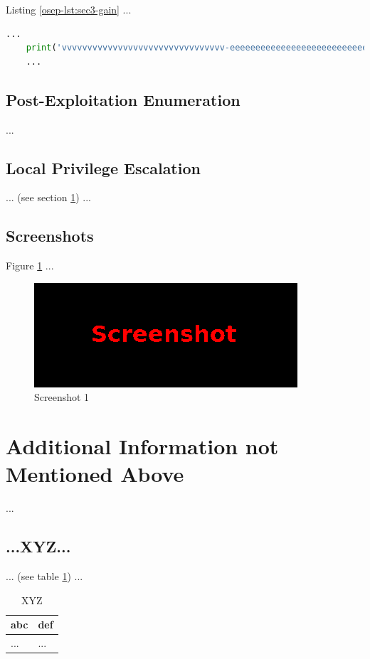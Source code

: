 Listing \ref{osep-lst:sec3-gain} ...\\

\begin{lstlisting}[language=Python,caption={Proof of Concept}, label={osep-lst:sec3-gain}]
    ...
    print('vvvvvvvvvvvvvvvvvvvvvvvvvvvvvvvv-eeeeeeeeeeeeeeeeeeeeeeeeeeeeeeeeeeeeeeeeeee-looooooooooooooooooooooong-striiiiiiiiiiiiiing')
    ...
\end{lstlisting}
%
%
%
\subsection{Post-Exploitation Enumeration}\label{osep-sec:sec3-enum2}
%
...
%
%
%
\subsection{Local Privilege Escalation}\label{osep-sec:sec3-privescal}
%
... (see section \ref{osep-sec:last}) ...
%
%
%
\subsection{Screenshots}\label{osep-sec:sec3-screens}
%
Figure \ref{osep-fig:sec3-screen1} ...

\begin{figure}[H]
    \centering
    \includegraphics[width=\textwidth]{img/assignment1/screen1.png}
    \caption{Screenshot 1}\label{osep-fig:sec3-screen1}
\end{figure}
%
%
%
\section{Additional Information not Mentioned Above}\label{osep-sec:last}
%
...
%
%
%
\subsection{...XYZ...}\label{osep-sec:last-xyz}
%
... (see table \ref{osep-tbl:last-xyz}) ...

\begin{table}[H]
    \begin{tabularx}{\textwidth}{l|l}
        \textbf{abc} & \textbf{def} \\
        \hline
        ... & ...\\
    \end{tabularx}
    \caption{XYZ\label{osep-tbl:last-xyz}}
\end{table}
%
%
%